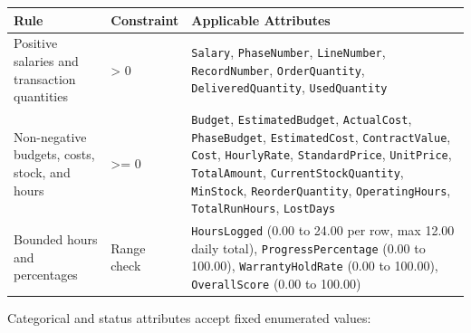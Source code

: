 \documentclass[a4paper,12pt]{report}
\newcounter{none} %
\begin{document}
{\def\LTcaptype{none} %
\begin{longtable}[]{@{}
  >{\raggedright\arraybackslash}p{}
  >{\raggedright\arraybackslash}p{}
  >{\raggedright\arraybackslash}p{}@{}}
\toprule\noalign{}
\begin{minipage}[b]{\linewidth}\raggedright
Rule
\end{minipage} & \begin{minipage}[b]{\linewidth}\raggedright
Constraint
\end{minipage} & \begin{minipage}[b]{\linewidth}\raggedright
Applicable Attributes
\end{minipage} \\
\midrule\noalign{}
\endhead
\bottomrule\noalign{}
\endlastfoot
Positive salaries and transaction quantities & \textgreater{} 0 & \texttt{Salary}, \texttt{PhaseNumber}, \texttt{LineNumber}, \texttt{RecordNumber}, \texttt{OrderQuantity}, \texttt{DeliveredQuantity}, \texttt{UsedQuantity} \\
Non-negative budgets, costs, stock, and hours & \textgreater= 0 & \texttt{Budget}, \texttt{EstimatedBudget}, \texttt{ActualCost}, \texttt{PhaseBudget}, \texttt{EstimatedCost}, \texttt{ContractValue}, \texttt{Cost}, \texttt{HourlyRate}, \texttt{StandardPrice}, \texttt{UnitPrice}, \texttt{TotalAmount}, \texttt{CurrentStockQuantity}, \texttt{MinStock}, \texttt{ReorderQuantity}, \texttt{OperatingHours}, \texttt{TotalRunHours}, \texttt{LostDays} \\
Bounded hours and percentages & Range check & \texttt{HoursLogged} (\allowbreak{}0.00 to 24.00 per row, max 12.00 daily total), \texttt{ProgressPercentage} (\allowbreak{}0.00 to 100.00), \texttt{WarrantyHoldRate} (\allowbreak{}0.00 to 100.00), \texttt{OverallScore} (\allowbreak{}0.00 to 100.00) \\
\end{longtable}
}

Categorical and status attributes accept fixed enumerated values:
\end{document}
